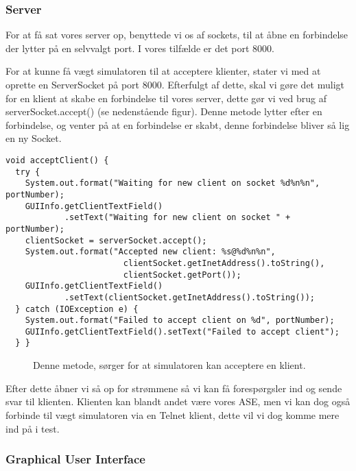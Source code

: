 \documentclass[a4paper]{article}
\newenvironment{changemargin}[2]{%
\begin{list}{}{%
\setlength{\topsep}{0pt}%
\setlength{\leftmargin}{#1}%
\setlength{\rightmargin}{#2}%
\setlength{\listparindent}{\parindent}%
\setlength{\itemindent}{\parindent}%
\setlength{\parsep}{\parskip}%
}%
\item[]}{\end{list}}
\begin{document}
\subsubsection{Server} %

For at få sat vores server op, benyttede vi os af sockets, til at åbne en forbindelse der lytter på en selvvalgt port. I vores tilfælde er det port 8000.

For at kunne få vægt simulatoren til at acceptere klienter, stater vi med at oprette en ServerSocket på port 8000. Efterfulgt af dette, skal vi gøre det muligt for en klient at skabe en forbindelse til vores server, dette gør vi ved brug af serverSocket.accept() (se nedenstående figur). Denne metode lytter efter en forbindelse, og venter på at en forbindelse er skabt, denne forbindelse bliver så lig en ny Socket.

\begin{changemargin}{-0.3cm}{-1.5cm}
\begin{lstlisting}
void acceptClient() {
  try {
    System.out.format("Waiting for new client on socket %d%n%n", portNumber);
    GUIInfo.getClientTextField()
            .setText("Waiting for new client on socket " + portNumber);
    clientSocket = serverSocket.accept();
    System.out.format("Accepted new client: %s@%d%n%n",
                        clientSocket.getInetAddress().toString(),
                        clientSocket.getPort());
    GUIInfo.getClientTextField()
            .setText(clientSocket.getInetAddress().toString());
  } catch (IOException e) {
    System.out.format("Failed to accept client on %d", portNumber);
    GUIInfo.getClientTextField().setText("Failed to accept client");
  } }
\end{lstlisting}
\end{changemargin}
\begin{figure}[H]
  \caption{Denne metode, sørger for at simulatoren kan acceptere en klient.}
\end{figure}

Efter dette åbner vi så op for strømmene så vi kan få forespørgsler ind og sende svar til klienten. Klienten kan blandt andet være vores ASE, men vi kan dog også forbinde til vægt simulatoren via en Telnet klient, dette vil vi dog komme mere ind på i test.


\subsubsection{Graphical User Interface} %
\end{document}
